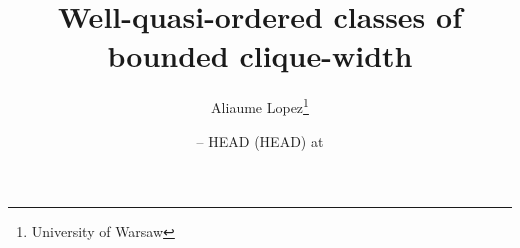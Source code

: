 %

\title{Well-quasi-ordered classes of bounded clique-width}
\author{%
        Aliaume Lopez\thanks{University of Warsaw}
    }

\date{ -- HEAD (HEAD) at }

\newcommand{\makeabstract}{
\begin{abstract}
    From words to trees.
\end{abstract}
}
